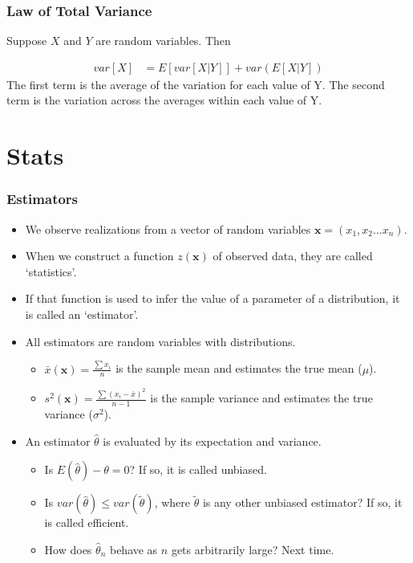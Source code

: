 \documentclass[aspectratio=169, handout]{beamer}
\numberwithin{equation}{section}
\begin{document}
\begin{frame}
\frametitle{Law of Total Variance}
Suppose $X$ and $Y$ are random variables.  Then 

\begin{align*}
var[X] &= E[var[X|Y]]+var(E[X|Y])  
\end{align*}
The first term is the average of the variation for each value of Y.\pause
The second term is the variation across the averages within each value of Y.
\end{frame}

\section{Stats}

\begin{frame}
\frametitle{Estimators}
\begin{itemize}
\item We observe realizations from a vector of random variables $\boldsymbol{x}=(x_1, x_2 \ldots x_n)$. \pause
\item When we construct a function $z(\boldsymbol{x})$ of observed data, they are called `statistics'. \pause  
\item If that function is used to infer the value of a parameter of a distribution, it is called an `estimator'.\pause
\item All estimators are random variables with distributions.\pause
\begin{itemize}
\item $\bar{x}(\boldsymbol{x})=\frac{\sum x_i }{n}$ is the sample mean and estimates the true mean ($\mu$). \pause
\item $s^2(\boldsymbol{x})=\frac{\sum (x_i-\bar{x})^2 }{n-1}$ is the sample variance and estimates  the true variance ($\sigma^2$).\\ \pause
\end{itemize}
\item An estimator $\hat{\theta}$ is evaluated by its expectation and variance.
\begin{itemize}
\item Is $E(\hat{\theta})-\theta=0$?  If so, it is called unbiased.
\item Is $var(\hat{\theta})\leq var(\tilde{\theta})$, where $\tilde{\theta}$ is any other unbiased estimator?  If so, it is called efficient.
\item How does $\hat{\theta}_n$ behave as $n$ gets arbitrarily large? Next time. 
\end{itemize}
\end{itemize}
\end{frame}
\end{document}
